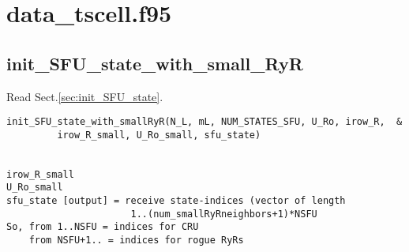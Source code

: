 \chapter{data\_tscell.f95}

\section{init\_SFU\_state\_with\_small\_RyR}
\label{sec:init_SFU_state_with_small_RyR}

Read Sect.\ref{sec:init_SFU_state}. 
\begin{verbatim}
init_SFU_state_with_smallRyR(N_L, mL, NUM_STATES_SFU, U_Ro, irow_R,  &
         irow_R_small, U_Ro_small, sfu_state)
         

irow_R_small
U_Ro_small
sfu_state [output] = receive state-indices (vector of length 
                      1..(num_smallRyRneighbors+1)*NSFU
So, from 1..NSFU = indices for CRU
    from NSFU+1.. = indices for rogue RyRs         
\end{verbatim}